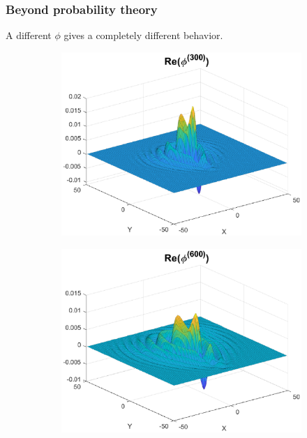 \documentclass{beamer}
\theoremstyle{definition}
\begin{document}
\begin{frame}
\frametitle{Beyond probability theory}

A different $\phi$ gives a completely different behavior.

\begin{figure}
\begin{subfigure}{0.38\textwidth}
	\centering
	\includegraphics[width=\textwidth]{conv_ex0.eps}
\end{subfigure}
\begin{subfigure}{0.38\textwidth}
	\centering
	\includegraphics[width=\textwidth]{conv_ex1.eps}
\end{subfigure}
\end{figure}
\vspace{-19pt}



\end{frame}
\end{document}
